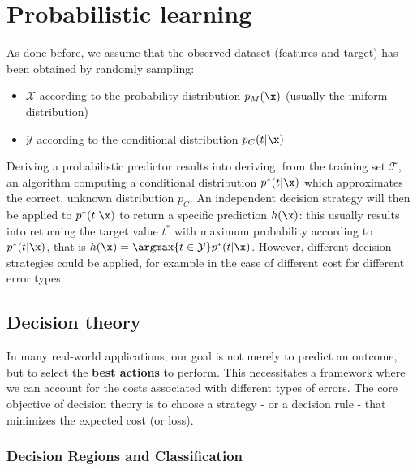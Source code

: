 
\chapter{Probabilistic learning}

	As done before, we assume that the observed dataset (features and target) has been obtained by randomly sampling:
	\begin{itemize}
		\item $\mathcal{X}$ according to the probability distribution $p_M(\x)$ (usually the uniform distribution)
		\item $\mathcal{Y}$ according to the conditional distribution $p_C(t|\x)$
	\end{itemize}

	Deriving a probabilistic predictor results into deriving, from the training set $\mathcal{T}$, an algorithm computing a conditional distribution $p^*(t|\x)$ which approximates the correct, unknown distribution $p_C$.
An independent \alert{decision strategy} will then be applied to $p^*(t|\x)$ to return a specific prediction $h(\x)$: this usually results into returning the target value $t^*$ with maximum probability according to $p^*(t|\x)$, that is $h(\x)=\argmax{t\in\mathcal{Y}}p^*(t|\x)$. However, different decision strategies could be applied, for example in the case of different cost for different error types.

\section*{Decision theory}

In many real-world applications, our goal is not merely to predict an outcome, but to select the \textbf{best actions} to perform. This necessitates a framework where we can account for the costs associated with different types of errors. The core objective of decision theory is to choose a strategy - or a decision rule - that minimizes the \alert{expected cost} (or loss).

\subsection*{Decision Regions and Classification}

